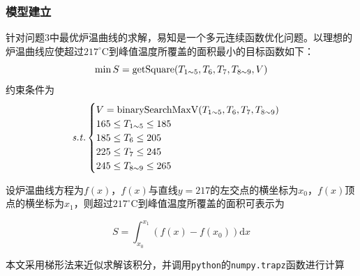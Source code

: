 \documentclass[../main.tex]{subfiles}
\begin{document}
\subsubsection{模型建立}
针对问题3中最优炉温曲线的求解，易知是一个多元连续函数优化问题。以理想的炉温曲线应使超过\(217 ^{\circ}\mathrm{C}\)到峰值温度所覆盖的面积最小的目标函数如下：
\begin{equation}
\min S = \mathrm{getSquare} (T _{1 {\sim} 5},T _{6} , T _{7} , T _{8 {\sim} 9}, V) \\
\end{equation}
约束条件为
\begin{equation}{\it s.t.}
	\begin{cases}
		V = \mathrm{binarySearchMaxV} (T _{1{\sim} 5}, T_{6} , T _{7},T_{8{\sim} 9})\\
		165 \le T_{1 {\sim} 5} \le 185\\
		185 \le T _{6} \le 205 \\
		225 \le T _{7} \le 245 \\
		245 \le T _{8 {\sim} 9} \le 265
	\end{cases}
\end{equation}
	
设炉温曲线方程为$f(x)$，$f(x)$与直线$y=217$的左交点的横坐标为$x_0$，$f(x)$顶点的横坐标为$x_1$，则超过$217^{\circ}\mathrm{C}$到峰值温度所覆盖的面积可表示为

\begin{equation}
S = \int _{x_0} ^{x_1} {(f(x)-f(x_0)) \mathrm{d} x}
\end{equation}

本文采用梯形法来近似求解该积分，并调用\texttt{python}的\texttt{numpy.trapz}函数进行计算
	
\end{document}
